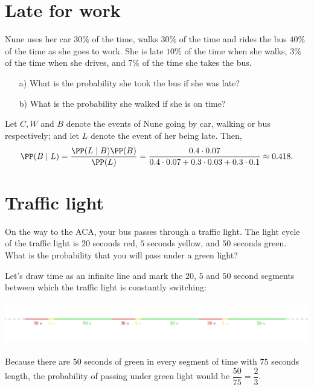 \section{Late for work}
\begin{problem} %
    Nune uses her car $30\%$ of the time, walks $30\%$ of the time and rides the bus $40\%$ of the time as she goes to work. She is late $10\%$ of the time when she walks, $3\%$ of the time when she drives, and $7\%$ of the time she takes the bus.
    \begin{enumerate}
        \item[a) ] What is the probability she took the bus if she was late?
        
        \item[b) ] What is the probability she walked if she is on time?
    \end{enumerate}
\end{problem}
\bigskip
\begin{solution} %
    Let $C, W$ and $B$ denote the events of Nune going by car, walking or bus respectively; and let $L$ denote the event of her being late. Then,
    \[
    \displaystyle{\PP(B\mid L) = \frac{\PP(L\mid B) \PP(B)}{\PP(L)}= \frac{0.4 \cdot 0.07}{0.4 \cdot 0.07 +0.3 \cdot 0.03+0.3\cdot 0.1} \approx 0.418.}
    \]
\end{solution}

\section{Traffic light}
\begin{problem} %
    On the way to the ACA, your
bus passes through a traffic light. The light cycle of the traffic light is $20$
seconds red, $5$ seconds yellow, and $50$ seconds green. What is the
probability that you will pass under a green light?
\end{problem}
\bigskip
\begin{solution} %
Let's draw time as an infinite line and mark the $20$, $5$ and $50$ second segments between which the traffic light is constantly switching:
\\~\\
{    \centering
    \includegraphics[width=1\linewidth]{figs/solution_light.png}}
\\~\\
Because there are $50$ seconds of green in every segment of time with $75$ seconds length, the probability of passing under green light would be $\dfrac{50}{75} = \dfrac{2}{3}$.

\end{solution}

